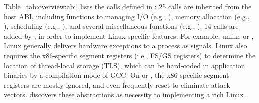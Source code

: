 




Table~\ref{tab:overview:abi} lists the \palcallnum{} calls defined in \thehostabi{}:
25 calls are inherited from the \drawbridge{} host ABI,
including functions to managing I/O (e.g., ), memory allocation (e.g., ), scheduling (e.g., ), and several miscellaneous functions (e.g., ).
14 calls are added by \graphene{}, in order to implement Linux-specific features.
For example, unlike \win{} or \osx{}, Linux generally
delivers hardware exceptions to a process as signals.
Linux also requires 
the x86-specific segment registers (i.e., FS/GS registers)
to determine the location of thread-local storage (TLS), which can be hard-coded in application binaries by a compilation mode of GCC.
On \win{} or \osx{}, the x86-specific segment registers are mostly ignored, and even frequently reset to eliminate attack vectors.
\graphene{} discovers these abstractions as necessity to implementing a rich Linux \libos{}.



